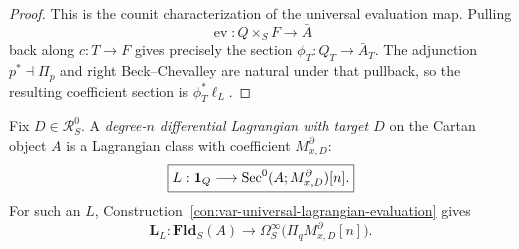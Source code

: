 \begin{proof}
This is the counit characterization of the universal evaluation map.  Pulling
\[
    \operatorname{ev}:Q\times_SF\to\bar A
\]
back along \(c:T\to F\) gives precisely the section \(\phi_T:Q_T\to\bar A_T\).  The adjunction \(p^*\dashv\Pi_p\) and right Beck--Chevalley are natural under that pullback, so the resulting coefficient section is \(\phi_T^*\ell_L\).
\end{proof}

\begin{definition}
\label{def:var-differential-lagrangian}
Fix \(D\in\mathcal R_S^0\). A \emph{degree-\(n\) differential Lagrangian with target \(D\)} on the Cartan object \(A\) is a Lagrangian class with coefficient \(M^\partial_{x,D}\):
\[
    \boxed{
    L:\mathbf 1_Q
    \longrightarrow
    \operatorname{Sec}^0(A;M^\partial_{x,D})[n].
    }
\]
For such an \(L\), Construction~\ref{con:var-universal-lagrangian-evaluation} gives
\[
    \mathbf L_L:
    \mathbf{Fld}_S(A)
    \longrightarrow
    \Omega_S^\infty
    \bigl(\Pi_qM^\partial_{x,D}[n]\bigr).
\]
\end{definition}


